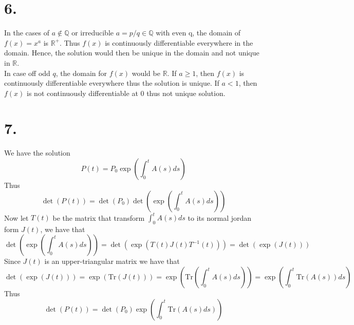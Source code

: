 \documentclass[11pt]{article}
\theoremstyle{mystyle}
\theoremstyle{definition}
\begin{document}
\section*{6.}
In the cases of $a \notin \mathbb{Q}$ or irreducible $a = p/q \in \mathbb{Q}$ with even q, the domain of $f(x) = x^a$ is $\mathbb{R}^+$. Thus $f(x)$ is continuously differentiable everywhere in the domain. Hence, the solution would then be unique in the domain and not unique in $\mathbb{R}$. \\
In case off odd $q$, the domain for $f(x)$ would be $\mathbb{R}$. If $a \ge 1$, then $f(x)$ is continuously differentiable everywhere thus the solution is unique. If $a < 1$, then $f(x)$ is not continuously differentiable at $0$ thus not unique solution. 
\clearpage
\section*{7.}
We have the solution 
\[
  P(t) = P_0 \exp\left( \int_0^t A(s) ds \right)
\]
Thus 
\[
  \det(P(t)) = \det(P_0) \det\left(\exp\left(\int_0^t A(s) ds\right)\right)
\]
Now let $T(t)$ be the matrix that transform $\int_0^t A(s) ds$ to its normal jordan form $J(t)$, we have that 
\[
  \det\left(\exp\left(\int_0^t A(s) ds \right)\right) = \det(\exp(T(t) J(t) T^{-1}(t))) = \det(\exp(J(t)))
\]
Since $J(t)$ is an upper-triangular matrix we have that 
\[
  \det(\exp(J(t))) = \exp(\text{Tr}(J(t))) = \exp\left(\text{Tr}\left(\int_0^t A(s) ds\right)\right) = \exp\left(\int_0^t \text{Tr}(A(s)) ds\right)
\]
Thus 
\[
  \det(P(t)) = \det(P_0) \exp\left( \int_0^t \text{Tr}(A(s)ds)\right)
\]
\end{document}
